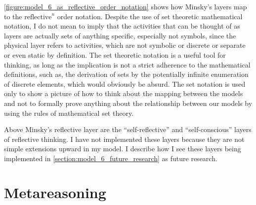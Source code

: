 \autoref{figure:model_6_as_reflective_order_notation} shows how
Minsky's layers map to the $\text{reflective}^n$ order notation.
Despite the use of set theoretic mathematical notation, I do not mean
to imply that the activities that can be thought of as layers are
actually sets of anything specific, especially not symbols, since the
physical layer refers to activities, which are not symbolic or
discrete or separate or even static by definition.  The set theoretic
notation is a useful tool for thinking, as long as the implication is
not a strict adherence to the mathematical definitions, such as, the
derivation of sets by the potentially infinite enumeration of discrete
elements, which would obviously be absurd.  The set notation is used
only to show a picture of how to think about the mapping between the
models and not to formally prove anything about the relationship
between our models by using the rules of mathematical set theory.

Above Minsky's reflective layer are the ``self-reflective'' and
``self-conscious'' layers of reflective thinking.  I have not
implemented these layers because they are not simple extensions upward
in my model.  I describe how I see these layers being implemented in
\autoref{section:model_6_future_research} as future research.

\section{Metareasoning}


